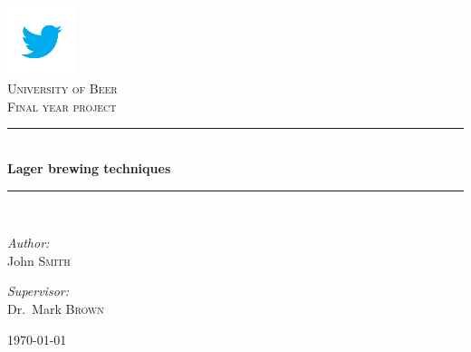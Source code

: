 \documentclass[pdftex,12pt,a4paper]{book}
\newcommand{\HRule}{\rule{\linewidth}{0.5mm}}
\begin{document}
\begin{titlepage}
\begin{center}


\includegraphics[width=0.15\textwidth]{./logo}\\[1cm]    

\textsc{\LARGE University of Beer}\\[1.5cm]

\textsc{\Large Final year project}\\[0.5cm]

\HRule \\[0.4cm]
{ \huge \bfseries Lager brewing techniques}\\[0.4cm]
\HRule \\[1.5cm]

\begin{minipage}{0.4\textwidth}
\begin{flushleft} \large
\emph{Author:}\\
John \textsc{Smith}
\end{flushleft}
\end{minipage}
\begin{minipage}{0.4\textwidth}
\begin{flushright} \large
\emph{Supervisor:} \\
Dr.~Mark \textsc{Brown}
\end{flushright}
\end{minipage}

\vfill

{\large \today}

\end{center}
\end{titlepage}
\end{document}
